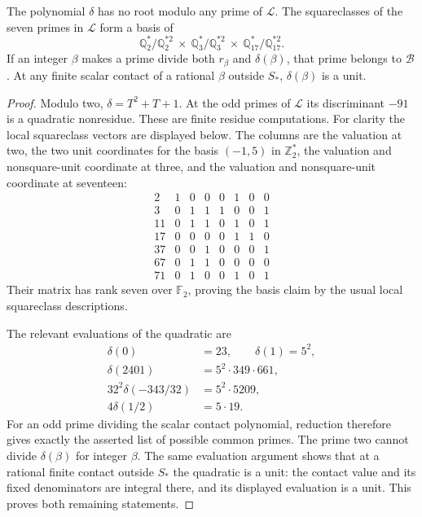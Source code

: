 \begin{lemma}
\label{lem:scalar-fixed-quadratic}
The polynomial $\delta$ has no root modulo any prime of $\mathcal L$.
The squareclasses of the seven primes in $\mathcal L$ form a basis
of
\[
 \mathbb Q_2^*/\mathbb Q_2^{*2}\ \times\
 \mathbb Q_3^*/\mathbb Q_3^{*2}\ \times\
 \mathbb Q_{17}^*/\mathbb Q_{17}^{*2}.
\]
If an integer $\beta$ makes a prime divide both $r_\beta$ and
$\delta(\beta)$, that prime belongs to $\mathcal B$.  At any finite
scalar contact of a rational $\beta$ outside $S_*$, $\delta(\beta)$
is a unit.
\end{lemma}
\begin{proof}
Modulo two, $\delta=T^2+T+1$.  At the odd primes of $\mathcal L$
its discriminant $-91$ is a quadratic nonresidue.  These are finite
residue computations.  For clarity the local squareclass vectors
are displayed below.  The columns are the valuation at two, the
two unit coordinates for the basis $(-1,5)$ in $\mathbb Z_2^*$,
the valuation and nonsquare-unit coordinate at three, and the
valuation and nonsquare-unit coordinate at seventeen:
\[
\begin{array}{c|rrrrrrr}
2 &1&0&0&0&1&0&0\\
3 &0&1&1&1&0&0&1\\
11&0&1&1&0&1&0&1\\
17&0&0&0&0&1&1&0\\
37&0&0&1&0&0&0&1\\
67&0&1&1&0&0&0&0\\
71&0&1&0&0&1&0&1
\end{array}
\]
Their matrix has rank seven over $\mathbb F_2$, proving the basis
claim by the usual local squareclass descriptions.

The relevant evaluations of the quadratic are
\[
 \begin{split}
 \delta(0)&=23,\qquad \delta(1)=5^2,\\
 \delta(2401)&=5^2\cdot349\cdot661,\\
 32^2\delta(-343/32)&=5^2\cdot5209,\\
 4\delta(1/2)&=5\cdot19.
 \end{split}
\]
For an odd prime dividing the scalar contact polynomial, reduction
therefore gives exactly the asserted list of possible common primes.
The prime two cannot divide $\delta(\beta)$ for integer $\beta$.
The same evaluation argument shows that at a rational finite
contact outside $S_*$ the quadratic is a unit: the contact value
and its fixed denominators are integral there, and its displayed
evaluation is a unit.  This proves both remaining statements.
\end{proof}

